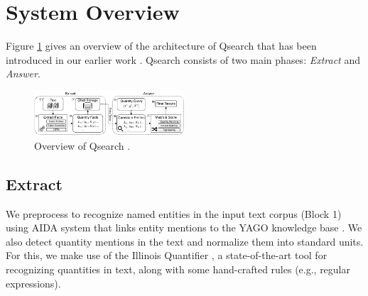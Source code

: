 \section{System Overview}
\label{sec:system_overview}

Figure \ref{fig:system} 
gives an overview of the architecture of 
Qsearch that has been introduced in our earlier work \cite{HoISWC2019}. 
Qsearch consists of two main phases:
\textit{Extract}
and \textit{Answer}.
 

\begin{figure}[t]
\centering
\includegraphics[width=0.5\textwidth]{figures/overview.pdf}
\caption{Overview of Qsearch \cite{HoISWC2019}.}
\label{fig:system}
\vspace{-1em}
\end{figure}

\subsection{Extract}  
We preprocess to recognize named entities in the input text corpus (Block 1) using AIDA \cite{DBLP:conf/emnlp/HoffartYBFPSTTW11} system that links entity mentions
to the YAGO knowledge base \cite{DBLP:conf/www/SuchanekKW07}.
We also detect quantity mentions in the text and normalize them into standard units. For this, we make use of the Illinois Quantifier \cite{DBLP:journals/tacl/RoyVR15}, a state-of-the-art tool for 
recognizing quantities in text, along with some hand-crafted rules (e.g., regular expressions). 

